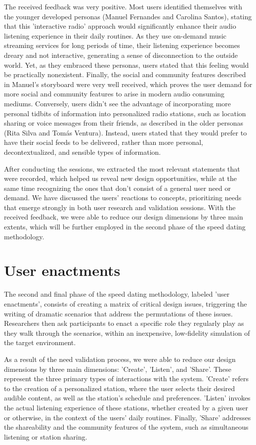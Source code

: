The received feedback was very positive. Most users identified themselves with the younger developed personas (Manuel Fernandes and Carolina Santos), stating that this 'interactive radio' approach would significantly enhance their audio listening experience in their daily routines. As they use on-demand music streaming services for long periods of time, their listening experience becomes dreary and not interactive, generating a sense of disconnection to the outside world. Yet, as they embraced these personas, users stated that this feeling would be practically nonexistent. Finally, the social and community features described in Manuel's storyboard were very well received, which proves the user demand for more social and community features to arise in modern audio consuming mediums. Conversely, users didn't see the advantage of incorporating more personal tidbits of information into personalized radio stations, such as location sharing or voice messages from their friends, as described in the older personas (Rita Silva and Tomás Ventura). Instead, users stated that they would prefer to have their social feeds to be delivered, rather than more personal, decontextualized, and sensible types of information.

After conducting the sessions, we extracted the most relevant statements that were recorded, which helped us reveal new design opportunities, while at the same time recognizing the ones that don't consist of a general user need or demand. We have discussed the users' reactions to concepts, prioritizing needs that emerge strongly in both user research and validation sessions. With the received feedback, we were able to reduce our design dimensions by three main extents, which will be further employed in the second phase of the speed dating methodology.

\section{User enactments}

The second and final phase of the speed dating methodology, labeled 'user enactments', consists of creating a matrix of critical design issues, triggering the writing of dramatic scenarios that address the permutations of these issues. Researchers then ask participants to enact a specific role they regularly play as they walk through the scenarios, within an inexpensive, low-fidelity simulation of the target environment. ~\cite{Davidoff2007}

As a result of the need validation process, we were able to reduce our design dimensions by three main dimensions: 'Create', 'Listen', and 'Share'. These represent the three primary types of interactions with the system. 'Create' refers to the creation of a personalized station, where the user selects their desired audible content, as well as the station's schedule and preferences. 'Listen' invokes the actual listening experience of these stations, whether created by a given user or otherwise, in the context of the users' daily routines. Finally, 'Share' addresses the shareability and the community features of the system, such as simultaneous listening or station sharing.

